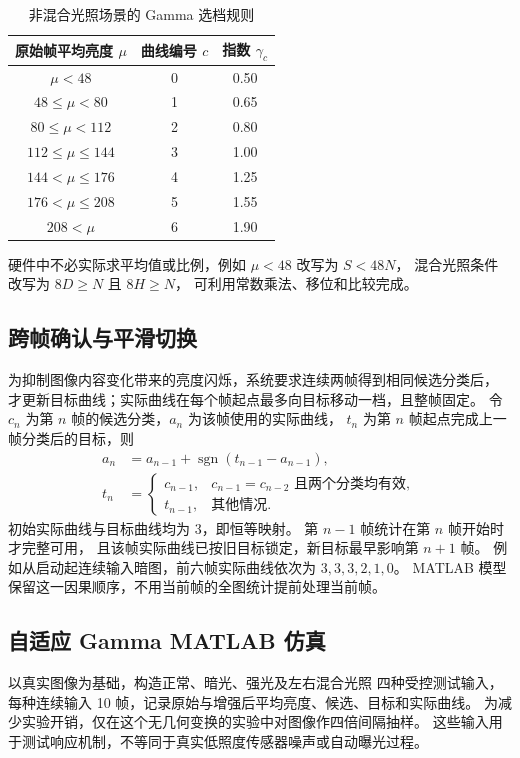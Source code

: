 \begin{table}[htbp]\centering\small
\caption{非混合光照场景的 Gamma 选档规则}
\label{tab:gamma-classification}
\begin{tabular}{ccc}
\toprule
原始帧平均亮度 $\mu$ & 曲线编号 $c$ & 指数 $\gamma_c$\\
\midrule
$\mu<48$ & 0 & 0.50\\
$48\leq\mu<80$ & 1 & 0.65\\
$80\leq\mu<112$ & 2 & 0.80\\
$112\leq\mu\leq144$ & 3 & 1.00\\
$144<\mu\leq176$ & 4 & 1.25\\
$176<\mu\leq208$ & 5 & 1.55\\
$208<\mu$ & 6 & 1.90\\
\bottomrule
\end{tabular}
\end{table}

硬件中不必实际求平均值或比例，例如 $\mu<48$ 改写为 $S<48N$，
混合光照条件改写为 $8D\geq N$ 且 $8H\geq N$，
可利用常数乘法、移位和比较完成。

\subsection{跨帧确认与平滑切换}
为抑制图像内容变化带来的亮度闪烁，系统要求连续两帧得到相同候选分类后，
才更新目标曲线；实际曲线在每个帧起点最多向目标移动一档，且整帧固定。
令 $c_n$ 为第 $n$ 帧的候选分类，$a_n$ 为该帧使用的实际曲线，
$t_n$ 为第 $n$ 帧起点完成上一帧分类后的目标，则
\begin{align}
a_n&=a_{n-1}+\operatorname{sgn}(t_{n-1}-a_{n-1}),\\
t_n&=\begin{cases}
c_{n-1},&c_{n-1}=c_{n-2}\text{ 且两个分类均有效},\\
t_{n-1},&\text{其他情况}.
\end{cases}
\end{align}
初始实际曲线与目标曲线均为 3，即恒等映射。
第 $n-1$ 帧统计在第 $n$ 帧开始时才完整可用，
且该帧实际曲线已按旧目标锁定，新目标最早影响第 $n+1$ 帧。
例如从启动起连续输入暗图，前六帧实际曲线依次为 $3,3,3,2,1,0$。
MATLAB 模型保留这一因果顺序，不用当前帧的全图统计提前处理当前帧。

\subsection{自适应 Gamma MATLAB 仿真}
 以真实图像为基础，构造正常、暗光、强光及左右混合光照
四种受控测试输入，每种连续输入 10 帧，记录原始与增强后平均亮度、候选、目标和实际曲线。
为减少实验开销，仅在这个无几何变换的实验中对图像作四倍间隔抽样。
这些输入用于测试响应机制，不等同于真实低照度传感器噪声或自动曝光过程。

